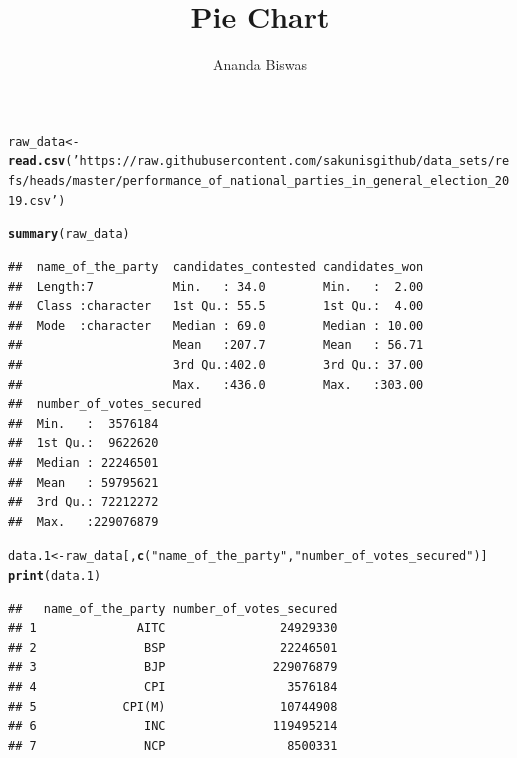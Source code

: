 \documentclass[11pt, a4paper]{article}\usepackage[]{graphicx}\usepackage[]{xcolor}
\title{Pie Chart}
\author{Ananda Biswas}
\date{}
\makeatletter
\newcommand{\hlsng}[1]{\textcolor[rgb]{0.192,0.494,0.8}{#1}}%
\newcommand{\hldef}[1]{\textcolor[rgb]{0.345,0.345,0.345}{#1}}%
\newcommand{\hlkwb}[1]{\textcolor[rgb]{0.69,0.353,0.396}{#1}}%
\newcommand{\hlkwd}[1]{\textcolor[rgb]{0.737,0.353,0.396}{\textbf{#1}}}%
\newenvironment{kframe}{%
 \def\at@end@of@kframe{}%
 \ifinner\ifhmode%
  \def\at@end@of@kframe{\end{minipage}}%
  \begin{minipage}{\columnwidth}%
 \fi\fi%
 \def\FrameCommand##1{\hskip\@totalleftmargin \hskip-\fboxsep
 \colorbox{shadecolor}{##1}\hskip-\fboxsep
     \hskip-\linewidth \hskip-\@totalleftmargin \hskip\columnwidth}%
 \MakeFramed {\advance\hsize-\width
   \@totalleftmargin\z@ \linewidth\hsize
   \@setminipage}}%
 {\par\unskip\endMakeFramed%
 \at@end@of@kframe}
\newenvironment{knitrout}{}{} %
\makeatother
\begin{document}
\maketitle

\begin{knitrout}\tiny
{}\color{fgcolor}\begin{kframe}
\begin{alltt}
\hldef{raw_data} \hlkwb{<-} \hlkwd{read.csv}\hldef{(}\hlsng{'https://raw.githubusercontent.com/sakunisgithub/data_sets/refs/heads/master/performance_of_national_parties_in_general_election_2019.csv'}\hldef{)}
\end{alltt}
\end{kframe}
\end{knitrout}

\begin{knitrout}
\color{fgcolor}\begin{kframe}
\begin{alltt}
\hlkwd{summary}\hldef{(raw_data)}
\end{alltt}
\begin{verbatim}
##  name_of_the_party  candidates_contested candidates_won  
##  Length:7           Min.   : 34.0        Min.   :  2.00  
##  Class :character   1st Qu.: 55.5        1st Qu.:  4.00  
##  Mode  :character   Median : 69.0        Median : 10.00  
##                     Mean   :207.7        Mean   : 56.71  
##                     3rd Qu.:402.0        3rd Qu.: 37.00  
##                     Max.   :436.0        Max.   :303.00  
##  number_of_votes_secured
##  Min.   :  3576184      
##  1st Qu.:  9622620      
##  Median : 22246501      
##  Mean   : 59795621      
##  3rd Qu.: 72212272      
##  Max.   :229076879
\end{verbatim}
\end{kframe}
\end{knitrout}

\begin{knitrout}
\color{fgcolor}\begin{kframe}
\begin{alltt}
\hldef{data.1} \hlkwb{<-} \hldef{raw_data[,}\hlkwd{c}\hldef{(}\hlsng{"name_of_the_party"}\hldef{,} \hlsng{"number_of_votes_secured"}\hldef{)]}
\hlkwd{print}\hldef{(data.1)}
\end{alltt}
\begin{verbatim}
##   name_of_the_party number_of_votes_secured
## 1              AITC                24929330
## 2               BSP                22246501
## 3               BJP               229076879
## 4               CPI                 3576184
## 5            CPI(M)                10744908
## 6               INC               119495214
## 7               NCP                 8500331
\end{verbatim}
\end{kframe}
\end{knitrout}
\end{document}
